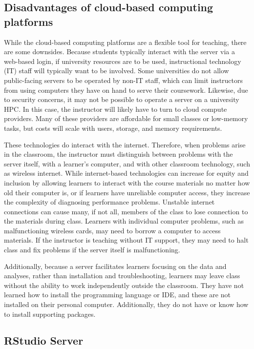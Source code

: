 \subsection{Disadvantages of cloud-based computing platforms}\label{subsub:cloud-disdvantage}

While the cloud-based computing platforms are a flexible tool for teaching, there are some downsides.
Because students typically interact with the server via a web-based login, if university resources are to be used, 
instructional technology (IT) staff will typically want to be involved.
Some universities do not allow public-facing servers to be operated by non-IT staff, which can 
limit instructors from using computers they have on hand to serve their coursework.
Likewise, due to security concerns, it may not be possible to operate a server on a university HPC.
In this case, the instructor will likely have to turn to cloud compute providers.
Many of these providers are affordable for small classes or low-memory tasks, but costs will scale with users, storage, and memory requirements.

These technologies do interact with the internet.
Therefore, when problems arise in the classroom, the instructor must distinguish between problems with the server itself, with a 
learner's computer, and with other classroom technology, such as wireless internet.
While internet-based technologies can increase for equity and inclusion by allowing learners to 
interact with the course materials no matter how old their computer is, or if learners have unreliable computer access, 
they increase the complexity of diagnosing performance problems.
Unstable internet connections can cause many, if not all, members of the class to lose connection to the materials during class.
Learners with individual computer problems, such as malfunctioning wireless cards, may need to borrow a computer to access materials. 
If the instructor is teaching without IT support, they may need to halt class and fix problems if the server itself is malfunctioning.

Additionally, because a server facilitates learners focusing on the data
and analyses, rather than installation and troubleshooting, learners may leave
class without the ability to work independently outside the classroom.
They have not learned how to install the programming language or IDE, and these 
are not installed on their personal computer.
Additionally, they do not have or know how to install supporting packages.


\subsection{RStudio Server}\label{subsub:RStudio}

